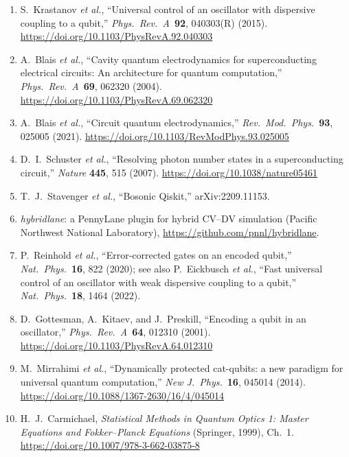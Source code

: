 \documentclass[11pt]{article}
\begin{document}
\begin{enumerate}
\item S.~Krastanov \emph{et al.}, ``Universal control of an oscillator with dispersive coupling to a qubit,'' \emph{Phys.\ Rev.\ A}\ \textbf{92}, 040303(R) (2015). \url{https://doi.org/10.1103/PhysRevA.92.040303}
\item A.~Blais \emph{et al.}, ``Cavity quantum electrodynamics for superconducting electrical circuits: An architecture for quantum computation,'' \emph{Phys.\ Rev.\ A}\ \textbf{69}, 062320 (2004). \url{https://doi.org/10.1103/PhysRevA.69.062320}
\item A.~Blais \emph{et al.}, ``Circuit quantum electrodynamics,'' \emph{Rev.\ Mod.\ Phys.}\ \textbf{93}, 025005 (2021). \url{https://doi.org/10.1103/RevModPhys.93.025005}
\item D.~I.~Schuster \emph{et al.}, ``Resolving photon number states in a superconducting circuit,'' \emph{Nature} \textbf{445}, 515 (2007). \url{https://doi.org/10.1038/nature05461}
\item T.~J.~Stavenger \emph{et al.}, ``Bosonic Qiskit,'' arXiv:2209.11153.
\item \emph{hybridlane}: a PennyLane plugin for hybrid CV--DV simulation (Pacific Northwest National Laboratory), \url{https://github.com/pnnl/hybridlane}.
\item P.~Reinhold \emph{et al.}, ``Error-corrected gates on an encoded qubit,'' \emph{Nat.\ Phys.}\ \textbf{16}, 822 (2020); see also P.~Eickbusch \emph{et al.}, ``Fast universal control of an oscillator with weak dispersive coupling to a qubit,'' \emph{Nat.\ Phys.}\ \textbf{18}, 1464 (2022).
\item D.~Gottesman, A.~Kitaev, and J.~Preskill, ``Encoding a qubit in an oscillator,'' \emph{Phys.\ Rev.\ A}\ \textbf{64}, 012310 (2001). \url{https://doi.org/10.1103/PhysRevA.64.012310}
\item M.~Mirrahimi \emph{et al.}, ``Dynamically protected cat-qubits: a new paradigm for universal quantum computation,'' \emph{New J.\ Phys.}\ \textbf{16}, 045014 (2014). \url{https://doi.org/10.1088/1367-2630/16/4/045014}
\item H.~J.~Carmichael, \emph{Statistical Methods in Quantum Optics 1: Master Equations and Fokker--Planck Equations} (Springer, 1999), Ch.~1. \url{https://doi.org/10.1007/978-3-662-03875-8}
\end{enumerate}
\end{document}
